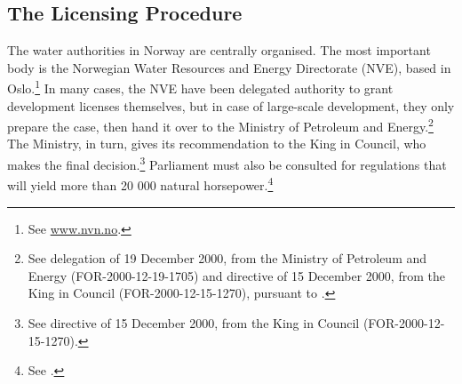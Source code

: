 %
%
%

\subsection{The Licensing Procedure}\label{sec:step}

The water authorities in Norway are centrally organised. The most important body is the Norwegian Water Resources and Energy Directorate (NVE), based in Oslo.\footnote{See \url{www.nvn.no}.} In many cases, the NVE have been delegated authority to grant development licenses themselves, but in case of large-scale development, they only prepare the case, then hand it over to the Ministry of Petroleum and Energy.\footnote{See delegation of 19 December 2000, from the Ministry of Petroleum and Energy (FOR-2000-12-19-1705) and directive of 15 December 2000, from the King in Council (FOR-2000-12-15-1270), pursuant to \cite[64]{wra00}.} The Ministry, in turn, gives its recommendation to the King in Council, who makes the final decision.\footnote{See directive of 15 December 2000, from the King in Council (FOR-2000-12-15-1270).} Parliament must also be consulted for regulations that will yield more than 20 000 natural horsepower.\footnote{See \cite[2]{wra17}.}

